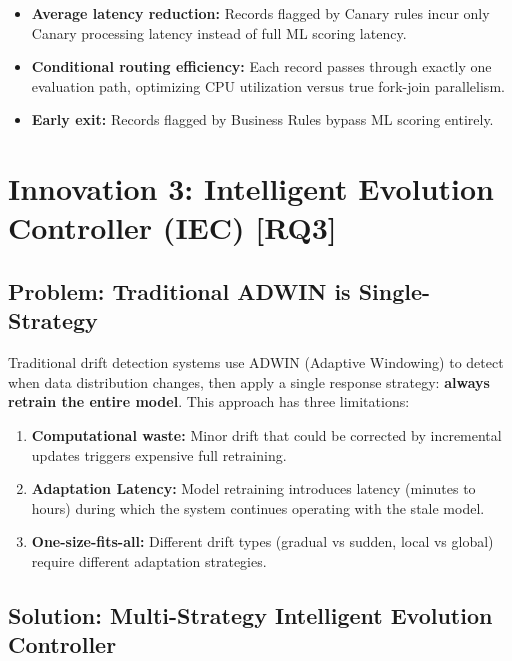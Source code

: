 \begin{itemize}
    \item \textbf{Average latency reduction:} Records flagged by Canary rules incur only Canary processing latency instead of full ML scoring latency.
    \item \textbf{Conditional routing efficiency:} Each record passes through exactly one evaluation path, optimizing CPU utilization versus true fork-join parallelism.
    \item \textbf{Early exit:} Records flagged by Business Rules bypass ML scoring entirely.
\end{itemize}

\section{Innovation 3: Intelligent Evolution Controller (IEC) [RQ3]}

\subsection{Problem: Traditional ADWIN is Single-Strategy}

Traditional drift detection systems use ADWIN (Adaptive Windowing) to detect when data distribution changes, then apply a single response strategy: \textbf{always retrain the entire model}. This approach has three limitations:

\begin{enumerate}
    \item \textbf{Computational waste:} Minor drift that could be corrected by incremental updates triggers expensive full retraining.
    \item \textbf{Adaptation Latency:} Model retraining introduces latency (minutes to hours) during which the system continues operating with the stale model.
    \item \textbf{One-size-fits-all:} Different drift types (gradual vs sudden, local vs global) require different adaptation strategies.
\end{enumerate}

\subsection{Solution: Multi-Strategy Intelligent Evolution Controller}

